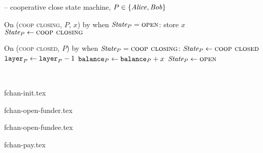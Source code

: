 \begin{center}
  \begin{systembox}{\fchan{} -- cooperative close state machine, $P \in
  \{\mathit{Alice}, \mathit{Bob}\}$}
    \begin{algorithmic}[1]
      \State On (\textsc{coop closing}, $P$, $x$) by \adversary when
      $\itistate_P = \textsc{open}$:
      \label{code:functionality:coop-close:when-coop-close}
      \Indent
        \State store $x$
        \State $\itistate_P \gets \textsc{coop closing}$
      \EndIndent
      \Statex

      \State On (\textsc{coop closed}, $P$) by \adversary when $\itistate_P =
      \textsc{coop closing}$:
      \Indent
         
          \State $\itistate_P \gets \textsc{coop closed}$
        \Else \: 
          \State $\texttt{layer}_{P} \gets \texttt{layer}_{P} - 1$
          \State $\texttt{balance}_{P} \gets \texttt{balance}_{P} + x$
          \label{code:functionality:coop-close:complete-coop-close}
          \State $\itistate_P \gets \textsc{open}$
        \EndIf
      \EndIndent
    \end{algorithmic}
  \end{systembox}
  \label{code:functionality:coop-close}
\end{center} \ \\

\begin{figure*}[p]
  {fchan-init.tex}
  \caption{\fchan state machine up to \textsc{init} (both parties)}
  \label{figure:fchan-state-init}
\end{figure*}

\begin{figure*}[p]
  {fchan-open-funder.tex}
  \caption{\fchan state machine from \textsc{init} up to \textsc{open}
  (funder)}
  \label{figure:fchan-state-open-funder}
\end{figure*}

\begin{figure*}[p]
  {fchan-open-fundee.tex}
  \caption{\fchan state machine from \textsc{init} up to \textsc{open}
  (fundee)}
  \label{figure:fchan-state-open-fundee}
\end{figure*}

\begin{figure*}[p]
  {fchan-pay.tex}
  \caption{\fchan state machine for payments (both parties)}
  \label{figure:fchan-state-pay}
\end{figure*}


